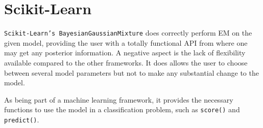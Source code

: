 \section*{Scikit-Learn}

\texttt{Scikit-Learn's BayesianGaussianMixture} does correctly perform EM on the given model, providing the user with a totally functional API from where one may get any posterior information. A negative aspect is the lack of flexibility available compared to the other frameworks. It does allows the user to choose between several model parameters but not to make any substantial change to the model.

As being part of a machine learning framework, it provides the necessary functions to use the model in a classification problem, such as \texttt{score()} and \texttt{predict()}.
